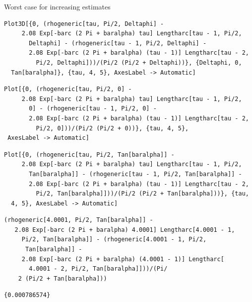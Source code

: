 \documentclass[reqno]{amsart}
\theoremstyle{definition} \newtheorem{definition}{Definition}[section]
\theoremstyle{definition} \newtheorem{remark}[definition]{Remark}
\theoremstyle{plain} \newtheorem{lemma}[definition]{Lemma}
\theoremstyle{plain} \newtheorem{proposition}[definition]{Proposition}
\theoremstyle{plain} \newtheorem{theorem}[definition]{Theorem}
\theoremstyle{plain} \newtheorem{corollary}[definition]{Corollary}
\theoremstyle{definition} \newtheorem{example}[definition]{Example}
\theoremstyle{plain} \newtheorem{claim}[clai]{Claim}
\theoremstyle{definition} \newtheorem{assumption}[definition]{Assumption}
\theoremstyle{definition} \newtheorem{observation}[definition]{Observation}
\newcommand{\1}{\mathbbm 1}
\newcommand{\smed}{\medskip}
\newcommand{\sbig}{\bigskip}
\numberwithin{equation}{section} %
\theoremstyle{plain} \newtheorem*{theorem*}{Theorem}
\theoremstyle{plain} \newtheorem{mthm}[maintheorem]{Main Theorem}
\theoremstyle{plain} \newtheorem*{mthm*}{Main Theorem}
\theoremstyle{plain} \newtheorem*{conjecture*}{Conjecture}
\theoremstyle{plain} \newtheorem{conjecture}[definition]{Conjecture}
\theoremstyle{plain} \newtheorem*{problem*}{Problem}
\begin{document}
\smed
Worst case for increasing estimates
\smed
\begin{verbatim}
Plot3D[{0, (rhogeneric[tau, Pi/2, Deltaphi] - 
     2.08 Exp[-barc (2 Pi + baralpha) tau] Lengtharc[tau - 1, Pi/2, 
       Deltaphi] - (rhogeneric[tau - 1, Pi/2, Deltaphi] - 
       2.08 Exp[-barc (2 Pi + baralpha) (tau - 1)] Lengtharc[tau - 2, 
         Pi/2, Deltaphi]))/(Pi/2 (Pi/2 + Deltaphi))}, {Deltaphi, 0, 
  Tan[baralpha]}, {tau, 4, 5}, AxesLabel -> Automatic]
\end{verbatim}
\begin{verbatim}
Plot[{0, (rhogeneric[tau, Pi/2, 0] - 
     2.08 Exp[-barc (2 Pi + baralpha) tau] Lengtharc[tau - 1, Pi/2, 
       0] - (rhogeneric[tau - 1, Pi/2, 0] - 
       2.08 Exp[-barc (2 Pi + baralpha) (tau - 1)] Lengtharc[tau - 2, 
         Pi/2, 0]))/(Pi/2 (Pi/2 + 0))}, {tau, 4, 5}, 
 AxesLabel -> Automatic]
\end{verbatim}
\begin{verbatim}
Plot[{0, (rhogeneric[tau, Pi/2, Tan[baralpha]] - 
     2.08 Exp[-barc (2 Pi + baralpha) tau] Lengtharc[tau - 1, Pi/2, 
       Tan[baralpha]] - (rhogeneric[tau - 1, Pi/2, Tan[baralpha]] - 
       2.08 Exp[-barc (2 Pi + baralpha) (tau - 1)] Lengtharc[tau - 2, 
         Pi/2, Tan[baralpha]]))/(Pi/2 (Pi/2 + Tan[baralpha]))}, {tau, 
  4, 5}, AxesLabel -> Automatic]
\end{verbatim}
\begin{verbatim}
(rhogeneric[4.0001, Pi/2, Tan[baralpha]] - 
   2.08 Exp[-barc (2 Pi + baralpha) 4.0001] Lengtharc[4.0001 - 1, 
     Pi/2, Tan[baralpha]] - (rhogeneric[4.0001 - 1, Pi/2, 
      Tan[baralpha]] - 
     2.08 Exp[-barc (2 Pi + baralpha) (4.0001 - 1)] Lengtharc[
       4.0001 - 2, Pi/2, Tan[baralpha]]))/(Pi/
    2 (Pi/2 + Tan[baralpha]))
\end{verbatim}
\begin{verbatim}
{0.000786574}
\end{verbatim}

\sbig


\sbig
\end{document}
